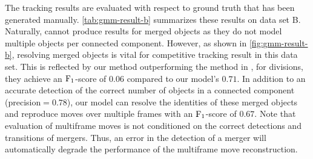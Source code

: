 The tracking results are evaluated with respect to ground truth that has been generated
manually. \cref{tab:gmm-result-b} summarizes these results on data set B. Naturally,
\citep{kausler_12_discrete} cannot produce results for merged objects as they do not model multiple
objects per connected component. However, as shown in \cref{fig:gmm-result-b}, resolving merged
objects is vital for competitive tracking result in this data set. This is reflected by our method
outperforming the method in \citet{kausler_12_discrete}, \eg for divisions, they achieve an
$\operatorname{F}_{1}$-score of $0.06$ compared to our model's $0.71$. In addition to an accurate detection of
the correct number of objects in a connected component (precision$=0.78$), our model can resolve the
identities of these merged objects and reproduce moves over multiple frames with an
$\operatorname{F}_{1}$-score of $0.67$. Note that evaluation of multiframe moves is not conditioned on the
correct detections and transitions of mergers. Thus, an error in the detection of a merger will
automatically degrade the performance of the multiframe move reconstruction.

